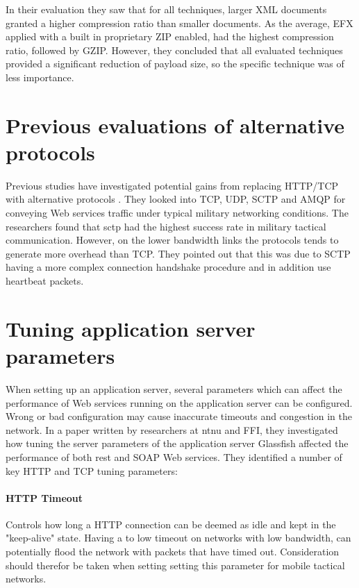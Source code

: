 In their evaluation they saw that for all techniques, larger XML documents
granted a higher compression ratio than smaller documents. As the average, EFX
applied with a built in proprietary ZIP enabled, had the highest compression
ratio, followed by GZIP. However, they concluded that all evaluated techniques
provided a significant reduction of payload size, so the specific technique was
of less importance.

\section{Previous evaluations of alternative protocols}

Previous studies have investigated potential gains from replacing HTTP/TCP with
alternative protocols \cite{evaluation-transport-protocols-web-services}. They
looked into TCP, UDP, SCTP and AMQP for conveying Web services traffic under
typical military networking conditions. The researchers found that \gls{sctp}
had the highest success rate in military tactical communication. However, on the
lower bandwidth links the protocols tends to generate more overhead than TCP.
They pointed out that this was due to SCTP having a more complex connection
handshake procedure and in addition use heartbeat packets.

\section{Tuning application server parameters}

When setting up an application server, several parameters which can affect the
performance of Web services running on the application server can be configured.
Wrong or bad configuration may cause inaccurate timeouts and congestion in the
network. In a paper written by researchers at \gls{ntnu} and
FFI\cite{johnsen-bloebaum-recommendations-web-services-tactical-domain}, they
investigated how tuning the server parameters of the application server
Glassfish affected the performance of both \gls{rest} and SOAP Web services.
They identified a number of key HTTP and TCP tuning parameters:



\paragraph{HTTP Timeout} Controls how long a HTTP connection can be deemed as
idle and kept in the "keep-alive" state. Having a to low timeout on networks
with low bandwidth, can potentially flood the network with packets that have
timed out. Consideration should therefor be taken when setting setting this
parameter for mobile tactical networks.

